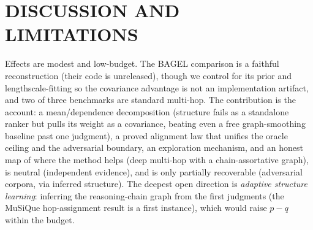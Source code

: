 \documentclass[twoside]{article}
\theoremstyle{plain}
\theoremstyle{definition}
\begin{document}
\section{DISCUSSION AND LIMITATIONS}\label{sec:disc}
Effects are modest and low-budget. The BAGEL comparison is a faithful reconstruction (their code is unreleased),
though we control for its prior and lengthscale-fitting so the covariance advantage is not an implementation
artifact, and two of three benchmarks are standard multi-hop. The contribution is the account: a mean/dependence
decomposition (structure fails as a standalone ranker but pulls its weight as a covariance, beating even a free
graph-smoothing baseline past one judgment), a proved alignment law that unifies the oracle ceiling and the
adversarial boundary, an exploration mechanism, and an honest map of where the method helps (deep multi-hop with a chain-assortative graph), is neutral
(independent evidence), and is only partially recoverable (adversarial corpora, via inferred structure). The
deepest open direction is \emph{adaptive structure learning}: inferring the reasoning-chain graph from the first
judgments (the MuSiQue hop-assignment result is a first instance), which would raise $p-q$ within the
budget.




\end{document}
